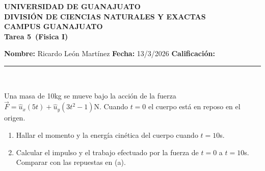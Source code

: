 \documentclass[12pt,a4paper]{article}
\newcommand{\alumno}{Ricardo León Martínez}
\newcommand{\materia}{Fisica I}
\newcommand{\tarea}{Tarea 5}
\newcommand{\fecha}{13/3/2026}
\begin{document}
    \begin{center}
    {\large\textbf{UNIVERSIDAD DE GUANAJUATO}}\\[0.3cm]
    {\normalsize\textbf{DIVISIÓN DE CIENCIAS NATURALES Y EXACTAS}}\\
    {\normalsize\textbf{CAMPUS GUANAJUATO}}\\[1cm]

    {\Large\textbf{\tarea\ (\materia)}}\\[1cm]
    \end{center}

    \textbf{Nombre:} \alumno \hfill 
    \textbf{Fecha:} \fecha \hfill 
    \textbf{Calificación:} \rule{3cm}{0.4pt} \\[0.3cm]

    \begin{problema}
        Una masa de 10kg se mueve bajo la acción de la fuerza $\vec{F}=\hat{u}_{x}(5t)+\hat{u}_{y}(3t^{2}-1)$N.
        Cuando $t=0$ el cuerpo está en reposo en el origen.
        \begin{enumerate}
            \item[(a)] Hallar el momento y la energía cinética del cuerpo cuando $t=10$s.
            \item[(b)] Calcular el impulso y el trabajo efectuado por la fuerza de $t=0$ a $t=10$s.
            Comparar con las repuestas en (a). 
        \end{enumerate}
    \end{problema}
\end{document}
